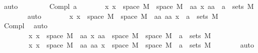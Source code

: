 \begin{isabellebody}
\ auto\isanewline
\ \ \isamarkupfalse%
\isanewline
\ \ \ \ \isamarkupfalse%
\ {\isacharparenleft}{\kern0pt}Compl\ a{\isacharparenright}{\kern0pt}\isanewline
\ \ \ \ \isamarkupfalse%
\ \isamarkupfalse%
\ {\isachardoublequoteopen}{\isasymAnd}x{\isachardot}{\kern0pt}\ x\ {\isasymin}\ space\ M{}\ {\isasymLongrightarrow}\ space\ M{}\ {\isacharminus}{\kern0pt}\ {\isacharbraceleft}{\kern0pt}aa{\isachardot}{\kern0pt}\ {\isacharparenleft}{\kern0pt}x{\isacharcomma}{\kern0pt}\ aa{\isacharparenright}{\kern0pt}\ {\isasymin}\ a{\isacharbraceright}{\kern0pt}\ {\isasymin}\ sets\ M{}{\isachardoublequoteclose}\isanewline
\ \ \ \ \ \ \isamarkupfalse%
\ auto\isanewline
\ \ \ \ \isamarkupfalse%
\ \isamarkupfalse%
\ {\isachardoublequoteopen}{\isasymAnd}x{\isachardot}{\kern0pt}\ x\ {\isasymin}\ space\ M{}\ {\isasymLongrightarrow}\ space\ M{}\ {\isacharminus}{\kern0pt}\ {\isacharbraceleft}{\kern0pt}aa{\isachardot}{\kern0pt}\ {\isacharparenleft}{\kern0pt}aa{\isacharcomma}{\kern0pt}\ x{\isacharparenright}{\kern0pt}\ {\isasymin}\ a{\isacharbraceright}{\kern0pt}\ {\isasymin}\ sets\ M{}{\isachardoublequoteclose}\isanewline
\ \ \ \ \ \ \isamarkupfalse%
\ Compl\ \isamarkupfalse%
\ auto\isanewline
\ \ \ \ \isamarkupfalse%
\ \isamarkupfalse%
\ \isanewline
\ \ \ \ \ \ \ \ {\isachardoublequoteopen}{\isasymAnd}x{\isachardot}{\kern0pt}\ x\ {\isasymin}\ space\ M{}\ {\isasymLongrightarrow}\ {\isacharbraceleft}{\kern0pt}aa{\isachardot}{\kern0pt}\ {\isacharparenleft}{\kern0pt}x{\isacharcomma}{\kern0pt}\ aa{\isacharparenright}{\kern0pt}\ {\isasymin}\ space\ M{}\ {\isasymtimes}\ space\ M{}\ {\isacharminus}{\kern0pt}\ a{\isacharbraceright}{\kern0pt}\ {\isasymin}\ sets\ M{}{\isachardoublequoteclose}\isanewline
\ \ \ \ \ \ \ \ {\isachardoublequoteopen}{\isasymAnd}x{\isachardot}{\kern0pt}\ x\ {\isasymin}\ space\ M{}\ {\isasymLongrightarrow}\ {\isacharbraceleft}{\kern0pt}aa{\isachardot}{\kern0pt}\ {\isacharparenleft}{\kern0pt}aa{\isacharcomma}{\kern0pt}\ x{\isacharparenright}{\kern0pt}\ {\isasymin}\ space\ M{}\ {\isasymtimes}\ space\ M{}\ {\isacharminus}{\kern0pt}\ a{\isacharbraceright}{\kern0pt}\ {\isasymin}\ sets\ M{}{\isachardoublequoteclose}\isanewline
\ \ \ \ \ \ \isamarkupfalse%
\ auto\isanewline
\ \ \ \ \ \ \isamarkupfalse%

\end{isabellebody}
